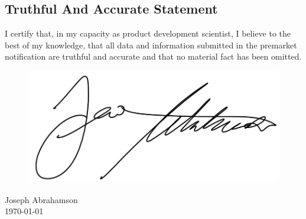 \newpage
\subsection{Truthful And Accurate Statement}

I certify that, in my capacity as product development scientist, I
believe to the best of my knowledge, that all data and information
submitted in the premarket notification are truthful and accurate and
that no material fact has been omitted.

\begin{figure}[H]
  \includegraphics[width=0.35\linewidth]{imgs/ja-sig}
\end{figure}

\noindent Joseph Abrahamson \\
\today

